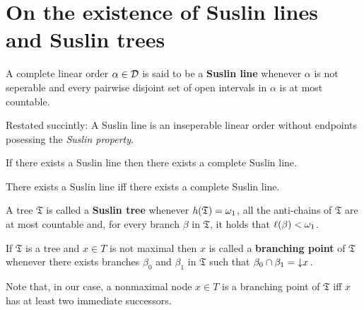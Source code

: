 \section{On the existence of Suslin lines and Suslin trees}

\begin{dfn}
	A complete linear order $\alpha\in\mathcal{D}$ is said to be a \textbf{Suslin line} whenever $\alpha$ is not seperable and every pairwise disjoint set of open intervals in $\alpha$ is at most countable.
\end{dfn}

Restated succintly:  A Suslin line is an inseperable linear order without endpoints posessing the \textit{Suslin property}.

\begin{prp}
	If there exists a Suslin line then there exists a complete Suslin line.
\end{prp}

\begin{cor}
	There exists a Suslin line iff there exists a complete Suslin line.
\end{cor}

\begin{dfn}
	A tree $\mathfrak{T}$ is called a \textbf{Suslin tree} whenever $\mathit{h}(\mathfrak{T})=\omega_1$, all the anti-chains of $\mathfrak{T}$ are at most countable and, for every branch $\beta$ in $\mathfrak{T}$, it holds that $\ell(\beta)<\omega_1$.
\end{dfn}

\begin{dfn}
	If $\mathfrak{T}$ is a tree and $x\in T$ is not maximal then $x$ is called a \textbf{branching point} of $\mathfrak{T}$ whenever there exists branches $\beta_0$ and $\beta_1$ in $\mathfrak{T}$ such that $\beta_0\cap \beta_1=\left\downarrow x\right.$.
\end{dfn}

Note that, in our case, a nonmaximal node $x\in T$ is a branching point of $\mathfrak{T}$ iff $x$ has at least two immediate successors.

